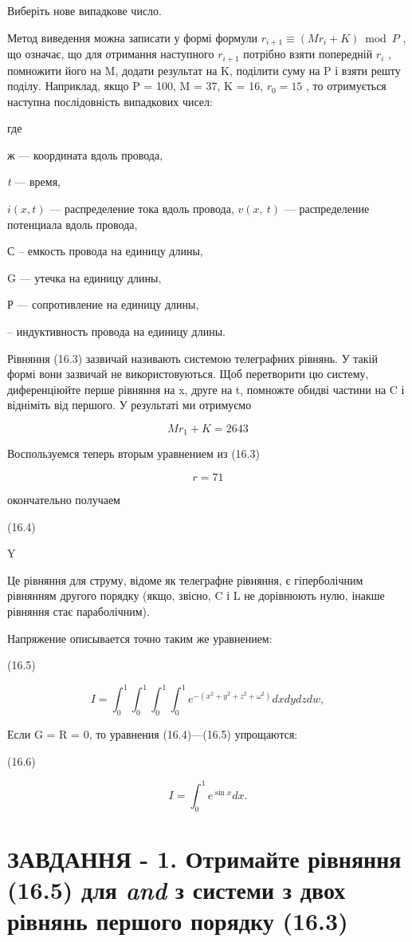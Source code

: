 \documentclass[
  ukrainian,
]{article}
\begin{document}
Виберіть нове випадкове число.

Метод виведення можна записати у формі формули
\(r_{i+1} \equiv (Mr_i + K) \bmod P\) , що означає, що для отримання
наступного \(r_{i+1}\) потрібно взяти попередній \(r_i\) , помножити
його на M, додати результат на K, поділити суму на P і взяти решту
поділу. Наприклад, якщо P = 100, M = 37, K = 16, \(r_0 = 15\) , то
отримується наступна послідовність випадкових чисел:

где

ж --- координата вдоль провода,

\emph{t} --- время,

\(i(x, t)\) --- распределение тока вдоль провода,
\(v\left(x,\ t\right)\) --- распределение потенциала вдоль провода,

С -- емкость провода на единицу длины,

G --- утечка на единицу длины,

Р --- сопротивление на единицу длины,

-- индуктивность провода на единицу длины.

Рівняння (16.3) зазвичай називають системою телеграфних рівнянь. У такій
формі вони зазвичай не використовуються. Щоб перетворити цю систему,
диференціюйте перше рівняння на x, друге на t, помножте обидві частини
на C і відніміть від першого. У результаті ми отримуємо

\[
Mr_1 + K = 2643
\]

Воспользуемся теперь вторым уравнением из (16.3)

\[
r = 71
\]

окончательно получаем

(16.4)

Y

Це рівняння для струму, відоме як телеграфне рівняння, є гіперболічним
рівнянням другого порядку (якщо, звісно, C і L не дорівнюють нулю,
інакше рівняння стає параболічним).

Напряжение описывается точно таким же уравнением:

(16.5)

\[
I = \int_{0}^{1} \int_{0}^{1} \int_{0}^{1} \int_{0}^{1} e^{-(x^{2}+y^{2}+z^{2}+\omega^{2})} dx dy dz dw,
\]

Если G = R = 0, то уравнения (16.4)---(16.5) упрощаются:

(16.6)

\[
I = \int_{0}^{1} e^{\sin x} dx.
\]

\section{\texorpdfstring{ЗАВДАННЯ - 1. Отримайте рівняння (16.5) для
\emph{and} з системи з двох рівнянь першого порядку
(16.3)}{ЗАВДАННЯ - 1. Отримайте рівняння (16.5) для and з системи з двох рівнянь першого порядку (16.3)}}\label{ux437ux430ux432ux434ux430ux43dux43dux44f---1.-ux43eux442ux440ux438ux43cux430ux439ux442ux435-ux440ux456ux432ux43dux44fux43dux43dux44f-16.5-ux434ux43bux44f-and-ux437-ux441ux438ux441ux442ux435ux43cux438-ux437-ux434ux432ux43eux445-ux440ux456ux432ux43dux44fux43dux44c-ux43fux435ux440ux448ux43eux433ux43e-ux43fux43eux440ux44fux434ux43aux443-16.3}
\end{document}
